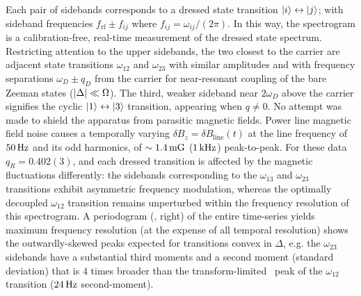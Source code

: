 \documentclass[aps,prl,reprint,superscriptaddress,floatfix]{revtex4-1}
\begin{document}
Each pair of sidebands corresponds to a dressed state transition $\vert i \rangle  \leftrightarrow \vert j \rangle $; with sideband frequencies  $f_{\text{rf}} \pm f_{ij}$ where $f_{ij} = \omega_{ij}/(2\pi)$.
In this way, the spectrogram is a calibration-free, real-time measurement of the dressed state spectrum.
Restricting attention to the upper sidebands, the two closest to the carrier are adjacent state transitions $\omega_{12}$ and $\omega_{23}$ with similar amplitudes and with frequency separations $\omega_D \pm q_D$ from the carrier for near-resonant coupling of the bare Zeeman states ($\vert \Delta \vert  \ll \Omega$).
The third, weaker sideband near $2\omega_D$ above the carrier signifies the cyclic $\vert 1 \rangle  \leftrightarrow \vert 3 \rangle $ transition, appearing when $q\neq 0$.
No attempt was made to shield the apparatus from parasitic magnetic fields.
Power line magnetic field noise causes a temporally varying $\delta B_z = \delta B_{\text{line}}(t)$ at the line frequency of $\unit[50]{Hz}$ and its odd harmonics, of $\sim\unit[1.4]{mG}$ ($\unit[1]{kHz}$) peak-to-peak.
For these data $q_R = 0.402(3)$, and each dressed transition is affected by the magnetic fluctuations differently: the sidebands corresponding to the $\omega_{13}$ and $\omega_{23}$ transitions exhibit asymmetric frequency modulation, whereas the optimally decoupled $\omega_{12}$ transition remains unperturbed within the frequency resolution of this spectrogram.
A periodogram (, right) of the entire time-series yields maximum frequency resolution (at the expense of all temporal resolution) shows the outwardly-skewed peaks expected for transitions convex in $\Delta$, e.g. the $\omega_{23}$ sidebands have a substantial third moments
and a second moment (standard deviation) that is $4$ times broader than the transform-limited~ peak of the $\omega_{12}$ transition ($\unit[24]{Hz}$ second-moment).
\end{document}
